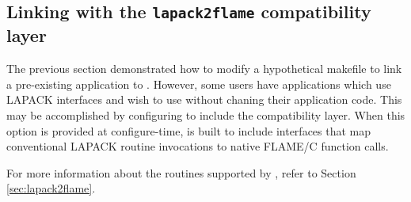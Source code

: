 \subsection{Linking with the {\tt lapack2flame} compatibility layer}


The previous section demonstrated how to modify a hypothetical makefile
to link a pre-existing application to \libflamens.
However, some users have applications which use LAPACK interfaces and
wish to use \libflame without chaning their application code.
This may be accomplished by configuring \libflame to include the
\lapacktflame compatibility layer.
When this option is provided at configure-time, \libflame is built
to include interfaces that map conventional LAPACK routine invocations to
native FLAME/C function calls.

For more information about the routines supported by \lapacktflame, refer
to Section \ref{sec:lapack2flame}.



